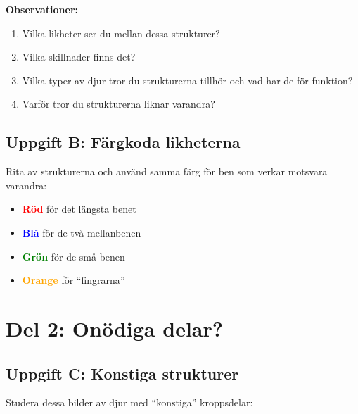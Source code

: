\documentclass[a4paper,11pt]{article}
\begin{document}
\textbf{Observationer:}
\begin{enumerate}
    \item Vilka likheter ser du mellan dessa strukturer?
    
    \vspace{2.5cm}
    
    \item Vilka skillnader finns det?
    
    \vspace{2.5cm}
    
    \item Vilka typer av djur tror du strukturerna tillhör och vad har de för funktion?
    
    \vspace{2.5cm}
    \item Varför tror du strukturerna liknar varandra?
\end{enumerate}


\newpage
\subsection{Uppgift B: Färgkoda likheterna}

Rita av strukturerna och använd samma färg för ben som verkar motsvara varandra:
\begin{itemize}
    \item \textcolor{red}{\textbf{Röd}} för det längsta benet
    \item \textcolor{blue}{\textbf{Blå}} för de två mellanbenen  
    \item \textcolor{green}{\textbf{Grön}} för de små benen
    \item \textcolor{orange}{\textbf{Orange}} för ``fingrarna''
\end{itemize}

\newpage

\section{Del 2: Onödiga delar?}

\subsection{Uppgift C: Konstiga strukturer}

Studera dessa bilder av djur med ``konstiga'' kroppsdelar:
\end{document}
